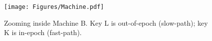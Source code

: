 \begin{figure}[t]
  \texttt{[image: Figures/Machine.pdf]}
  \caption{Zooming inside Machine B. Key L is out-of-epoch (slow-path); key K is in-epoch (fast-path).}
  \label{fig:machine}
\end{figure}